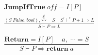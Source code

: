 \documentclass[12pt, a4paper]{report}
\newcommand{\ddfrac}[3]{
    & #1 \\
    & \frac { #2 } { #3 }
}
\newcommand{\gap}{ \;\;\;\; }
\begin{document}
\begin{equation*}
\begin{split}
\ddfrac{
    \mathbf{JumpIfTrue} \; \mathit{off} = I[P]
}{
    (S \; False, bool), \; \overbrace{\cdots}^{S^{'}} = S
    \gap
    S^{'} \vdash^{*} P + 1 \Rightarrow L
}{ S \vdash P \Rightarrow L }
\end{split}
\end{equation*}

$$
\dfrac{
    \mathbf{Return} = I[P]
    \gap
    a, \; \cdots = S
}{
    S \vdash P \Rightarrow \mathbf{return}\; a
}
$$

\medskip

% 
\end{document}
